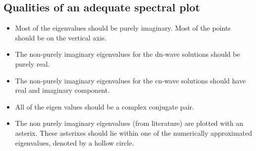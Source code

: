 \documentclass[12pt, titlepage]{article}
\begin{document}
\subsection{Qualities of an adequate spectral plot} \label{specplotlist}

\begin{itemize}
	\item Most of the eigenvalues should be purely imaginary. Most of the 
	points should be on the vertical axis. 
	\item The non-purely imaginary eigenvalues for the dn-wave solutions should 
	be purely real.
	\item The non-purely imaginary eigenvalues for the cn-wave solutions should 
	have real and imaginary component. 
	\item All of the eigen values should be a complex conjugate pair.
	\item The non purely imaginary eigenvalues (from literature) are plotted 
	with an asterix. These asterixes should lie within one of the numerically 
	approximated eigenvalues, denoted by a hollow circle. 
\end{itemize}
\end{document}
